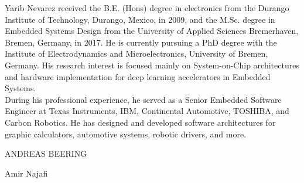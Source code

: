 \begin{IEEEbiography}{Yarib Nevarez} received the B.E. (Hons) degree in electronics from the Durango Institute of Technology, Durango, Mexico, in 2009, and the M.Sc. degree in Embedded Systems Design from the University of Applied Sciences Bremerhaven, Bremen, Germany, in 2017. He is currently pursuing a PhD degree with the Institute of Electrodynamics and Microelectronics, University of Bremen, Germany. His research interest is focused mainly on System-on-Chip architectures and hardware implementation for deep learning accelerators in Embedded Systems.
\\
During his professional experience, he served as a Senior Embedded Software Engineer at Texas Instruments, IBM, Continental Automotive, TOSHIBA, and Carbon Robotics. He has designed and developed software architectures for graphic calculators, automotive systems, robotic drivers, and more.
	
\end{IEEEbiography}

\begin{IEEEbiography}{ANDREAS BEERING}
\end{IEEEbiography}

\begin{IEEEbiography}{Amir Najafi}
\end{IEEEbiography}

